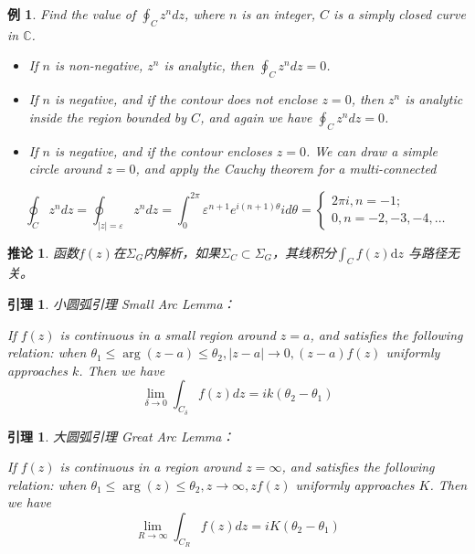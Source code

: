 \documentclass[10pt, a4paper, oneside]{ctexbook}
\newtheorem{lemma}[theorem]{引理}
\newtheorem{corollary}[theorem]{推论}
\newtheorem{example}[theorem]{例}
\def\D{\mathrm{d}}
\begin{document}
\begin{example}
Find the value of $\displaystyle \oint_{C} z^{n} d z$, where $n$ is an integer, $C$ is a simply closed curve in $\mathbb{C}$.
\begin{itemize} \rm
\item  If $n$ is non-negative, $z^{n}$ is analytic, then $\displaystyle \oint_{C} z^{n} d z=0$.
\item  If $n$ is negative, and if the contour does not enclose $z=0$, then $z^{n}$ is analytic inside the region bounded by $C$, and again we have $\displaystyle \oint_{C} z^{n} d z=0$.
\item  If $n$ is negative, and if the contour encloses $z=0$. We can draw a simple circle around $z=0$, and apply the Cauchy theorem for a multi-connected 
\end{itemize}
\begin{equation*}
\oint_{C} z^{n} d z=\oint_{|z|=\varepsilon} z^{n} d z=\int_{0}^{2 \pi} \varepsilon^{n+1} e^{i(n+1) \theta} i d \theta=\left\{\begin{array}{l}
2 \pi i, n=-1 ; \\
0, n=-2,-3,-4, \ldots
\end{array}\right.
\end{equation*}
\end{example}
\begin{corollary}
    函数$f(z)$在$\Sigma_G$内解析，如果$\Sigma_C\subset \Sigma_G$，其线积分$\displaystyle \int_C f(z)\D z$ 与路径无关。
\end{corollary}

\newpage

\begin{lemma}
    {\rm 小圆弧引理} Small Arc Lemma：

    {\rm If $f(z)$ is continuous in a small region around $z=a$, and satisfies the following relation: when $\theta_{1} \leq \arg (z-a) \leq \theta_{2},|z-a| \rightarrow 0,(z-a) f(z)$ uniformly approaches $k$. Then we have}
    $$\lim _{\delta \rightarrow 0} \int_{C_{\delta}} f(z) d z=i k\left(\theta_{2}-\theta_{1}\right)$$
\end{lemma}

\begin{lemma}
    {\rm 大圆弧引理} Great Arc Lemma：

    {\rm If $f(z)$ is continuous in a region around $z=\infty$, and satisfies the following relation: when $\theta_{1} \leq \arg (z) \leq \theta_{2}, z \rightarrow \infty, z f(z)$ uniformly approaches $K$. Then we have}
    \begin{equation*}
    \lim _{R \rightarrow \infty} \int_{C_{R}} f(z) d z=i K\left(\theta_{2}-\theta_{1}\right)
    \end{equation*}
\end{lemma}
\end{document}
